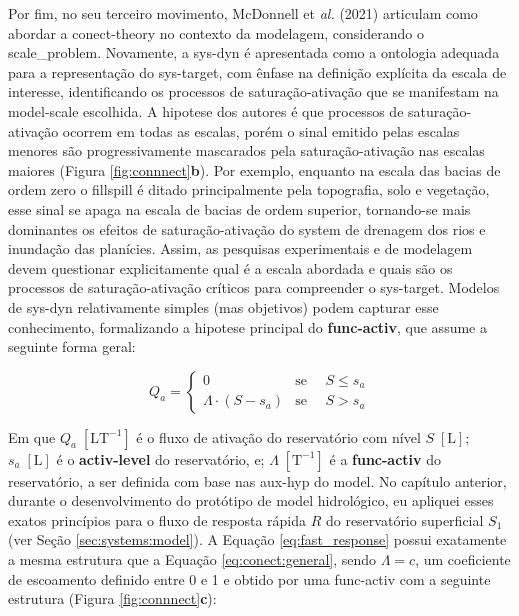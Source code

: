 \documentclass[./main.tex]{subfiles}
\begin{document}
\par Por fim, no seu terceiro movimento, McDonnell et \textit{al.} (2021) articulam como abordar a \gls{conect-theory} no contexto da modelagem, considerando o \gls{scale_problem}. Novamente, a \gls{sys-dyn} é apresentada como a ontologia adequada para a representação do \gls{sys-target}, com ênfase na definição explícita da escala de interesse, identificando os processos de saturação-ativação que se manifestam na \gls{model-scale} escolhida. A \gls{hipotese} dos autores é que processos de saturação-ativação ocorrem em todas as escalas, porém o sinal emitido pelas escalas menores são progressivamente mascarados pela saturação-ativação nas escalas maiores (Figura \ref{fig:connnect}\textbf{b}). Por exemplo, enquanto na escala das bacias de ordem zero o \gls{fillspill} é ditado principalmente pela topografia, solo e vegetação, esse sinal se apaga na escala de bacias de ordem superior, tornando-se mais dominantes os efeitos de saturação-ativação do \gls{system} de drenagem dos rios e inundação das planícies. Assim, as pesquisas experimentais e de modelagem devem questionar explicitamente qual é a escala abordada e quais são os processos de saturação-ativação críticos para compreender o \gls{sys-target}. Modelos de \gls{sys-dyn} relativamente simples (mas objetivos) podem capturar esse conhecimento, formalizando a \gls{hipotese} principal do \textbf{\gls{func-activ}}, que assume a seguinte forma geral:
\begin{linenomath*}
\begin{equation}
\label{eq:conect:general}
Q_a = 
\begin{cases} 
    0 & \text{se } \quad S \leq s_a\\
    \Lambda \cdot (S - s_a) & \text{se } \quad S > s_a
\end{cases}
\end{equation}
\end{linenomath*}
Em que $Q_a\;[\text{L}\text{T}^{-1}]$ é o fluxo de ativação do reservatório com nível $S\;[\text{L}]$; $s_{a}\;[\text{L}]$ é o \textbf{\gls{activ-level}} do reservatório, e; $\Lambda \;[\text{T}^{-1}]$ é a \textbf{\gls{func-activ}} do reservatório, a ser definida com base nas \gls{aux-hyp} do \gls{model}. No capítulo anterior, durante o desenvolvimento do protótipo de \gls{model} hidrológico, eu apliquei esses exatos princípios para o fluxo de resposta rápida $R$ do reservatório superficial $S_1$ (ver Seção \ref{sec:systems:model}). A Equação \eqref{eq:fast_response} possui exatamente a mesma estrutura que a Equação \eqref{eq:conect:general}, sendo $\Lambda = c$, um coeficiente de escoamento definido entre 0 e 1 e obtido por uma \gls{func-activ} com a seguinte estrutura (Figura \ref{fig:connnect}\textbf{c}):
\end{document}
